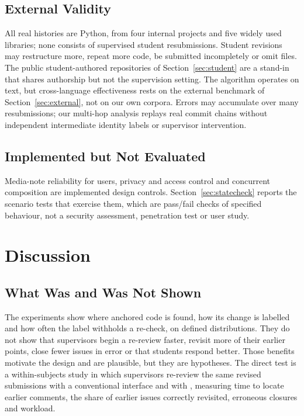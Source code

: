 \subsection{External Validity}
All real histories are Python, from four internal projects and five widely used libraries; none consists of supervised student resubmissions. Student revisions may restructure more, repeat more code, be submitted incompletely or omit files. The public student-authored repositories of Section~\ref{sec:student} are a stand-in that shares authorship but not the supervision setting. The algorithm operates on text, but cross-language effectiveness rests on the external benchmark of Section~\ref{sec:external}, not on our own corpora. Errors may accumulate over many resubmissions; our multi-hop analysis replays real commit chains without independent intermediate identity labels or supervisor intervention.

\subsection{Implemented but Not Evaluated}
Media-note reliability for users, privacy and access control and concurrent composition are implemented design controls. Section~\ref{sec:statecheck} reports the scenario tests that exercise them, which are pass/fail checks of specified behaviour, not a security assessment, penetration test or user study.

\section{Discussion}\label{sec:discussion}

\subsection{What Was and Was Not Shown}
The experiments show where anchored code is found, how its change is labelled and how often the label withholds a re-check, on defined distributions. They do not show that supervisors begin a re-review faster, revisit more of their earlier points, close fewer issues in error or that students respond better. Those benefits motivate the design and are plausible, but they are hypotheses. The direct test is a within-subjects study in which supervisors re-review the same revised submissions with a conventional interface and with \sys{}, measuring time to locate earlier comments, the share of earlier issues correctly revisited, erroneous closures and workload.

